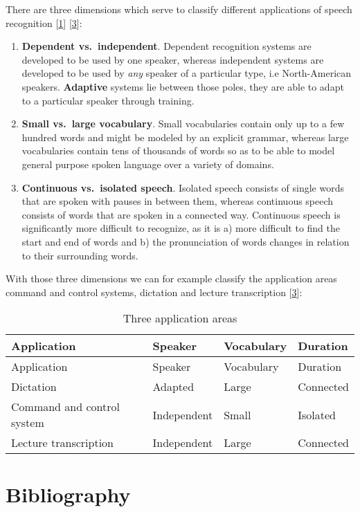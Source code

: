 There are three dimensions which serve to classify different
applications of speech recognition {[}\hyperref[ref-cmufaq]{1}{]}
{[}\hyperref[ref-marquard]{3}{]}:

\begin{enumerate}
\def\labelenumi{(\arabic{enumi})}
\item
  \textbf{Dependent vs.~independent}. Dependent recognition systems are
  developed to be used by one speaker, whereas independent systems are
  developed to be used by \emph{any} speaker of a particular type, i.e
  North-American speakers. \textbf{Adaptive} systems lie between those
  poles, they are able to adapt to a particular speaker through
  training.
\item
  \textbf{Small vs.~large vocabulary}. Small vocabularies contain only
  up to a few hundred words and might be modeled by an explicit grammar,
  whereas large vocabularies contain tens of thousands of words so as to
  be able to model general purpose spoken language over a variety of
  domains.
\item
  \textbf{Continuous vs.~isolated speech}. Isolated speech consists of
  single words that are spoken with pauses in between them, whereas
  continuous speech consists of words that are spoken in a connected
  way. Continuous speech is significantly more difficult to recognize,
  as it is a) more difficult to find the start and end of words and b)
  the pronunciation of words changes in relation to their surrounding
  words.
\end{enumerate}

With those three dimensions we can for example classify the application
areas command and control systems, dictation and lecture transcription
{[}\hyperref[ref-marquard]{3}{]}:

\begin{longtable}[c]{@{}llll@{}}
\caption{Three application areas}\tabularnewline
\toprule
Application & Speaker & Vocabulary & Duration\tabularnewline
\midrule
\endfirsthead
\toprule
Application & Speaker & Vocabulary & Duration\tabularnewline
\midrule
\endhead
Dictation & Adapted & Large & Connected\tabularnewline
Command and control system & Independent & Small &
Isolated\tabularnewline
Lecture transcription & Independent & Large & Connected\tabularnewline
\bottomrule
\end{longtable}

\newpage

\section*{Bibliography}\label{bibliography}

